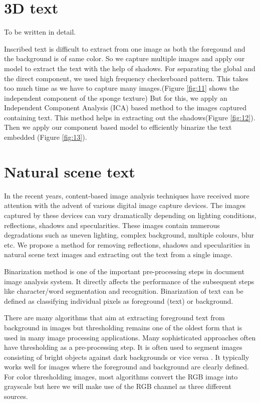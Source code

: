 \section{3D text}
To be written in detail.

Inscribed text is difficult to extract from one image as both the foregound and the background is of same 
color.
So we capture multiple images and apply our model to extract the text with the help of shadows.
For separating the global and the direct component, we used high frequency checkerboard pattern. 
This takes too much time as we have to capture many images.(Figure \ref{fig:11} shows
the independent component of the sponge texture)
But for this, we apply an Independent Component Analysis (ICA) based method to the images captured containing text.
This method helps in extracting out the shadows(Figure \ref{fig:12}). 
Then we apply our component based model to efficiently binarize the text
embedded (Figure \ref{fig:13}).

\section{Natural scene text}

In the recent years, content-based image analysis techniques have received more attention with the advent of various digital image capture devices.
The images captured by these devices can vary dramatically depending on lighting conditions, reflections, shadows and specularities.
These images contain numerous degradations such as uneven lighting, complex background, multiple colours, blur etc.
We propose a method for removing reflections, shadows and specularities in natural scene text images and extracting out the text from a single image. 
	
Binarization method is one of the important pre-processing steps in document image analysis system. 
It directly affects the performance of the subsequent steps like character/word segmentation and recognition.
Binarization of text can be defined as classifying individual pixels as foreground (text) or background. 

There are many algorithms that aim at extracting foreground text from background in images but thresholding remains one of
the oldest form that is used in many image processing applications. Many sophisticated approaches often have thresholding as a pre-processing step. 
It is often used to segment images consisting of bright objects against dark backgrounds or vice versa \cite{A1,A3,A4}.
It typically works well for images where the foreground and background are clearly defined.
For color thresholding images, most algorithms convert the 
RGB image into grayscale but here we will make use of the RGB channel as three different sources. 

